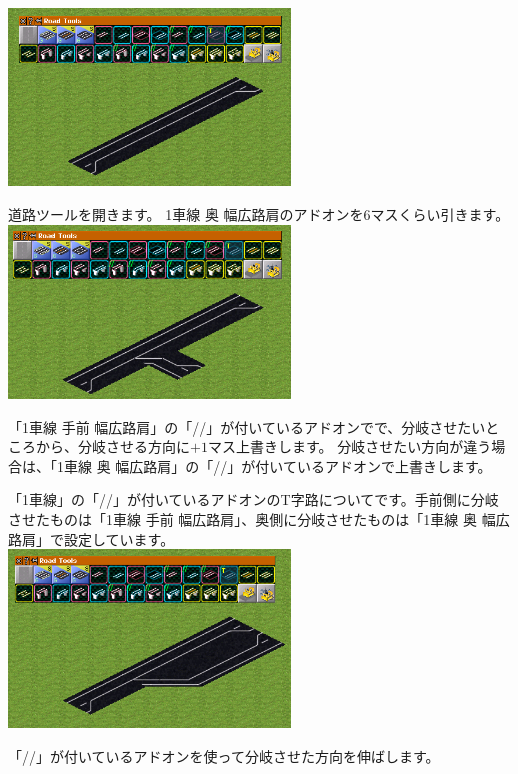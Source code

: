 \documentclass{jbook}
\begin{document}
\begin{multicols}{2}


\includegraphics[width = 75mm]{picture/20210214-road-3-1.png}

道路ツールを開きます。
1車線 奥 幅広路肩のアドオンを6マスくらい引きます。\\

\includegraphics[width = 75mm]{picture/20210214-road-3-2.png}

「1車線 手前 幅広路肩」の「//」が付いているアドオンでで、分岐させたいところから、分岐させる方向に$+1$マス上書きします。
分岐させたい方向が違う場合は、「1車線 奥 幅広路肩」の「//」が付いているアドオンで上書きします。

「1車線」の「//」が付いているアドオンのT字路についてです。手前側に分岐させたものは「1車線 手前 幅広路肩」、奥側に分岐させたものは「1車線 奥 幅広路肩」で設定しています。\\

\includegraphics[width = 75mm]{picture/20210214-road-3-3.png}

「//」が付いているアドオンを使って分岐させた方向を伸ばします。


\end{multicols}
\end{document}
